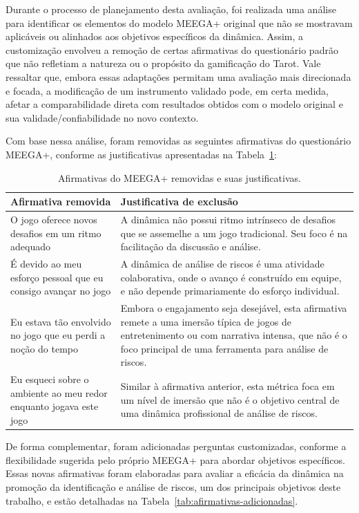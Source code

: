 \documentclass[
	12pt,
	openright,
	twoside,
	a4paper,
	english,
	brazil
	]{abntex2}
\begin{document}
Durante o processo de planejamento desta avaliação, foi realizada uma análise para identificar os elementos do modelo MEEGA+ original que não se mostravam aplicáveis ou alinhados aos objetivos específicos da dinâmica. Assim, a customização envolveu a remoção de certas afirmativas do questionário padrão que não refletiam a natureza ou o propósito da gamificação do Tarot. Vale ressaltar que, embora essas adaptações permitam uma avaliação mais direcionada e focada, a modificação de um instrumento validado pode, em certa medida, afetar a comparabilidade direta com resultados obtidos com o modelo original e sua validade/confiabilidade no novo contexto.

Com base nessa análise, foram removidas as seguintes afirmativas do questionário MEEGA+, conforme as justificativas apresentadas na Tabela~\ref{tab:afirmativas-removidas}:

\begin{table}[h!]
  \centering
  \caption{Afirmativas do MEEGA+ removidas e suas justificativas.}
  \label{tab:afirmativas-removidas}
  \begin{tabular}{|p{}|p{}|}
  \hline
  \textbf{Afirmativa removida} & \textbf{Justificativa de exclusão} \\ \hline
  O jogo oferece novos desafios em um ritmo adequado & A dinâmica não possui ritmo intrínseco de desafios que se assemelhe a um jogo tradicional. Seu foco é na facilitação da discussão e análise. \\ \hline
  É devido ao meu esforço pessoal que eu consigo avançar no jogo & A dinâmica de análise de riscos é uma atividade colaborativa, onde o avanço é construído em equipe, e não depende primariamente do esforço individual. \\ \hline
  Eu estava tão envolvido no jogo que eu perdi a noção do tempo & Embora o engajamento seja desejável, esta afirmativa remete a uma imersão típica de jogos de entretenimento ou com narrativa intensa, que não é o foco principal de uma ferramenta para análise de riscos. \\ \hline
  Eu esqueci sobre o ambiente ao meu redor enquanto jogava este jogo & Similar à afirmativa anterior, esta métrica foca em um nível de imersão que não é o objetivo central de uma dinâmica profissional de análise de riscos. \\ \hline
  \end{tabular}
\end{table}

De forma complementar, foram adicionadas perguntas customizadas, conforme a flexibilidade sugerida pelo próprio MEEGA+ para abordar objetivos específicos. Essas novas afirmativas foram elaboradas para avaliar a eficácia da dinâmica na promoção da identificação e análise de riscos, um dos principais objetivos deste trabalho, e estão detalhadas na Tabela~\ref{tab:afirmativas-adicionadas}.
\end{document}
